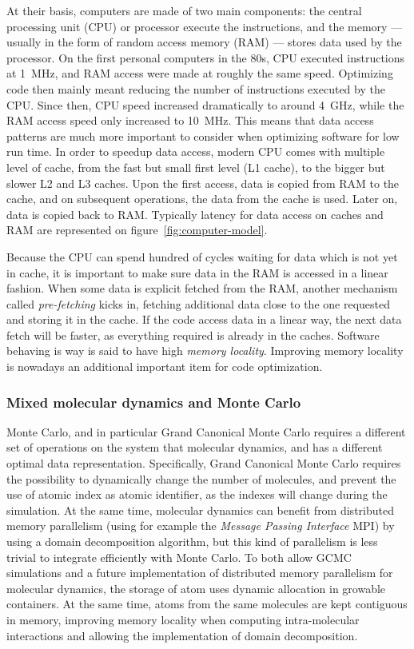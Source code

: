 \documentclass[thesis]{subfiles}
\begin{document}
At their basis, computers are made of two main components: the central
processing unit (CPU) or processor execute the instructions, and the memory ---
usually in the form of random access memory (RAM) --- stores data used by the
processor. On the first personal computers in the 80s, CPU executed instructions
at \SI{1}{MHz}, and RAM access were made at roughly the same speed. Optimizing
code then mainly meant reducing the number of instructions executed by the CPU.
Since then, CPU speed increased dramatically to around \SI{4}{GHz}, while the
RAM access speed only increased to \SI{10}{MHz}. This means that data access
patterns are much more important to consider when optimizing software for low
run time. In order to speedup data access, modern CPU comes with multiple level
of cache, from the fast but small first level (L1 cache), to the bigger but
slower L2 and L3 caches. Upon the first access, data is copied from RAM to the
cache, and on subsequent operations, the data from the cache is used. Later on,
data is copied back to RAM. Typically latency for data access on caches and RAM
are represented on figure~\ref{fig:computer-model}.

Because the CPU can spend hundred of cycles waiting for data which is not yet in
cache, it is important to make sure data in the RAM is accessed in a linear
fashion. When some data is explicit fetched from the RAM, another mechanism
called \emph{pre-fetching} kicks in, fetching additional data close to the one
requested and storing it in the cache. If the code access data in a linear way,
the next data fetch will be faster, as everything required is already in the
caches. Software behaving is way is said to have high \emph{memory locality}.
Improving memory locality is nowadays an additional important item for code
optimization.

\subsubsection{Mixed molecular dynamics and Monte Carlo}

Monte Carlo, and in particular Grand Canonical Monte Carlo requires a different
set of operations on the system that molecular dynamics, and has a different
optimal data representation. Specifically, Grand Canonical Monte Carlo requires
the possibility to dynamically change the number of molecules, and prevent the
use of atomic index as atomic identifier, as the indexes will change during the
simulation. At the same time, molecular dynamics can benefit from distributed
memory parallelism (using for example the \emph{Message Passing Interface} MPI)
by using a domain decomposition algorithm, but this kind of parallelism is less
trivial to integrate efficiently with Monte Carlo. To both allow GCMC
simulations and a future implementation of distributed memory parallelism for
molecular dynamics, the storage of atom uses dynamic allocation in growable
containers. At the same time, atoms from the same molecules are kept contiguous
in memory, improving memory locality when computing intra-molecular interactions
and allowing the implementation of domain decomposition.
\end{document}
